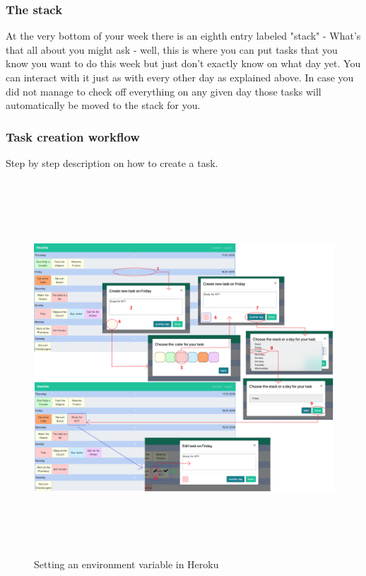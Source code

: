 \subsubsection{The stack}
At the very bottom of your week there is an eighth entry labeled "stack" - What's that all about you might ask - well, this is where you can put tasks that you know you want to do this week but just don't exactly know on what day yet.  You can interact with it just as with every other day as explained above.  
In case you did not manage to check off everything on any given day those tasks will automatically be moved to the stack for you.

\subsubsection{Task creation workflow}
Step by step description on how to create a task. 

	\begin{figure}[H] 
		\centering 
		\includegraphics[height=14cm]{figures/task_creation_workflow}    
		\caption[Task creation workflow]{Setting an environment variable in Heroku}     
		\label{fig: Task creation workflow}     
	\end{figure}  
	
